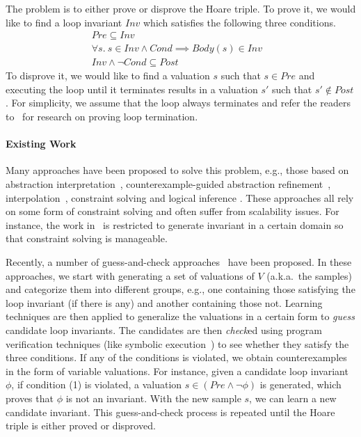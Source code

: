 The problem is to either prove or disprove the Hoare triple. To prove it, we would like to find a loop invariant $\mathit{Inv}$ which satisfies the following three conditions.
\begin{align}
    & Pre \subseteq Inv && \label{inv:pre} \\
    &\forall s.~s \in Inv \land Cond \implies Body(s) \in Inv && \label{inv:loop} \\
    & Inv \land \neg Cond \subseteq Post && \label{inv:post}
\end{align}
To disprove it, we would like to find a valuation $s$ such that $s \in \mathit{Pre}$ and executing the loop until it terminates results in a valuation $s'$ such that $s' \not \in \mathit{Post}$. For simplicity, we assume that the loop always terminates and refer the readers to~\cite{Domagoj:FAC:2013,Hong:ASE:2015} %
for research on proving loop termination.


\paragraph{Existing Work} Many approaches have been proposed to solve this problem, e.g., those based on abstraction interpretation~\cite{cousot1978automatic,mine2006octagon,vincent2009subpolyhedra},
counterexample-guided abstraction refinement~\cite{henzinger2003software,thomas2001slam,edmund2003counterexample}, interpolation~\cite{thomas2004abstractions,kenneth2003interpolation,Kenneth2006lazy}, constraint solving and logical inference \cite{ashutosh2009invgen,michael2003linear,sumit2009constraint,isil2013inductive}. These approaches all rely on some form of constraint solving and often suffer from scalability issues. For instance, the work in~\cite{mine2006octagon,vincent2009subpolyhedra,ashutosh2009invgen} is restricted to generate invariant in a certain domain so that constraint solving is manageable.

Recently, a number of guess-and-check approaches~\cite{sharma2012interpolants,sharma2013verification,DBLP:conf/esop/0001GHALN13,sharma2014invariant} have been proposed.
In these approaches, we start with generating a set of valuations of $V$ (a.k.a.~the samples) and categorize them into different groups, e.g., one containing those satisfying the loop invariant (if there is any) and another containing those not. Learning techniques are then applied to generalize the valuations in a certain form to \emph{guess} candidate loop invariants.
The candidates are then \emph{check}ed using program verification techniques (like symbolic execution~\cite{symbolic}) to see whether they satisfy the three conditions. If any of the conditions is violated, we obtain counterexamples in the form of variable valuations.
For instance, given a candidate loop invariant $\phi$, if condition (1) is violated, a valuation $s \in (Pre \land \neg \phi)$ is generated, which proves that $\phi$ is not an invariant.
With the new sample $s$, we can learn a new candidate invariant. This guess-and-check process is repeated until the Hoare triple is either proved or disproved.

